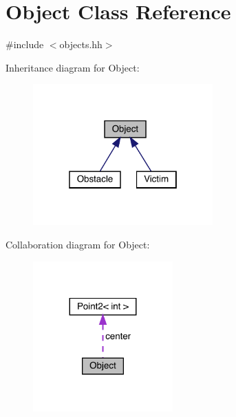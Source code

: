 \hypertarget{class_object}{}\section{Object Class Reference}
\label{class_object}


{\ttfamily \#include $<$objects.\+hh$>$}



Inheritance diagram for Object\+:
\nopagebreak
\begin{figure}[H]
\begin{center}
\leavevmode
\includegraphics[width=196pt]{class_object__inherit__graph}
\end{center}
\end{figure}


Collaboration diagram for Object\+:
\nopagebreak
\begin{figure}[H]
\begin{center}
\leavevmode
\includegraphics[width=152pt]{class_object__coll__graph}
\end{center}
\end{figure}
